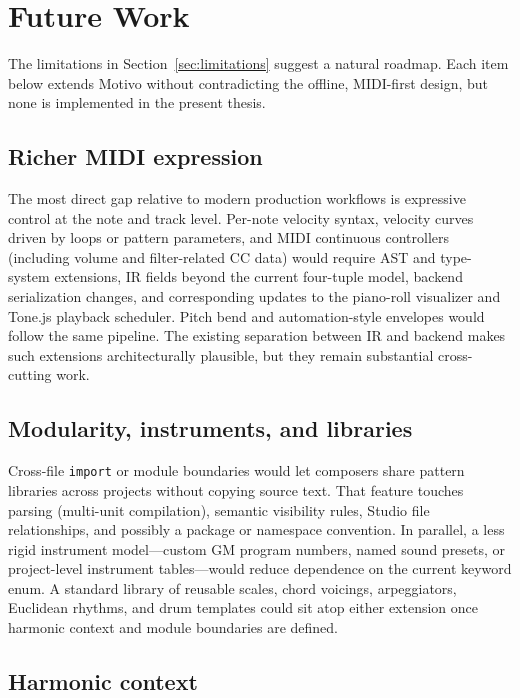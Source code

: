 \section{Future Work}\label{sec:future-work}

The limitations in Section~\ref{sec:limitations} suggest a natural roadmap.
Each item below extends Motivo without contradicting the offline, MIDI-first design, but none is implemented in the
present thesis.

\subsection{Richer MIDI expression}\label{subsec:fw-midi-expression}

The most direct gap relative to modern production workflows is expressive control at the note and track level.
Per-note velocity syntax, velocity curves driven by loops or pattern parameters, and MIDI continuous controllers
(including volume and filter-related CC data) would require AST and type-system extensions, IR fields beyond the
current four-tuple model, backend serialization changes, and corresponding updates to the piano-roll visualizer and
Tone.js playback scheduler.
Pitch bend and automation-style envelopes would follow the same pipeline.
The existing separation between IR and backend makes such extensions architecturally plausible, but they remain
substantial cross-cutting work.

\subsection{Modularity, instruments, and libraries}\label{subsec:fw-modularity}

Cross-file \texttt{import} or module boundaries would let composers share pattern libraries across projects without
copying source text.
That feature touches parsing (multi-unit compilation), semantic visibility rules, Studio file relationships, and
possibly a package or namespace convention.
In parallel, a less rigid instrument model---custom GM program numbers, named sound presets, or project-level
instrument tables---would reduce dependence on the current keyword enum.
A standard library of reusable scales, chord voicings, arpeggiators, Euclidean rhythms, and drum templates could sit
atop either extension once harmonic context and module boundaries are defined.

\subsection{Harmonic context}\label{subsec:fw-harmonic-context}

